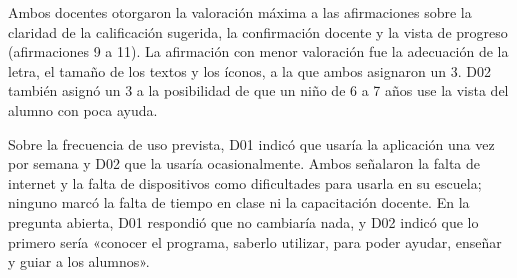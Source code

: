 Ambos docentes otorgaron la valoración máxima a las afirmaciones sobre la claridad de la calificación sugerida, la confirmación docente y la vista de progreso (afirmaciones 9 a 11). La afirmación con menor valoración fue la adecuación de la letra, el tamaño de los textos y los íconos, a la que ambos asignaron un 3. D02 también asignó un 3 a la posibilidad de que un niño de 6 a 7 años use la vista del alumno con poca ayuda.

Sobre la frecuencia de uso prevista, D01 indicó que usaría la aplicación una vez por semana y D02 que la usaría ocasionalmente. Ambos señalaron la falta de internet y la falta de dispositivos como dificultades para usarla en su escuela; ninguno marcó la falta de tiempo en clase ni la capacitación docente. En la pregunta abierta, D01 respondió que no cambiaría nada, y D02 indicó que lo primero sería «conocer el programa, saberlo utilizar, para poder ayudar, enseñar y guiar a los alumnos».
